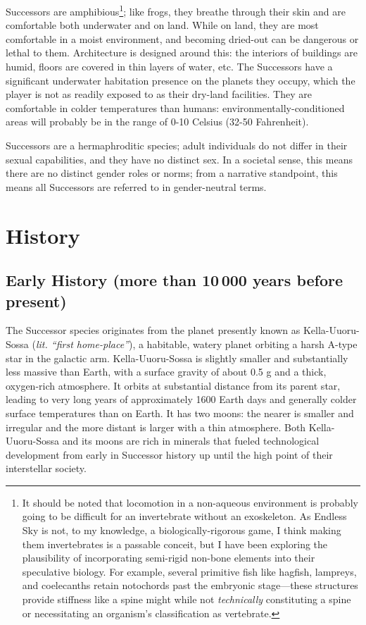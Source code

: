 \documentclass[11pt]{report}
\begin{document}
    Successors are amphibious\footnote[1]{It should be noted that locomotion in a non-aqueous environment is probably going to be difficult for an invertebrate without an exoskeleton. As Endless Sky is not, to my knowledge, a biologically-rigorous game, I think making them invertebrates is a passable conceit, but I have been exploring the plausibility of incorporating semi-rigid non-bone elements into their speculative biology. For example, several primitive fish like hagfish, lampreys, and coelecanths retain notochords past the embryonic stage---these structures provide stiffness like a spine might while not \emph{technically} constituting a spine or necessitating an organism's classification as vertebrate.}; like frogs, they breathe through their skin and are comfortable both underwater and on land. While on land, they are most comfortable in a moist environment, and becoming dried-out can be dangerous or lethal to them. Architecture is designed around this: the interiors of buildings are humid, floors are covered in thin layers of water, etc. The Successors have a significant underwater habitation presence on the planets they occupy, which the player is not as readily exposed to as their dry-land facilities. They are comfortable in colder temperatures than humans: environmentally-conditioned areas will probably be in the range of 0-10 Celsius (32-50 Fahrenheit).
    
    Successors are a hermaphroditic species; adult individuals do not differ in their sexual capabilities, and they have no distinct sex. In a societal sense, this means there are no distinct gender roles or norms; from a narrative standpoint, this means all Successors are referred to in gender-neutral terms.
    \section{History}
    \subsection{Early History (more than 10\,000 years before present)}
    The Successor species originates from the planet presently known as Kella-Uuoru-Sossa (\emph{lit. ``first home-place''}), a habitable, watery planet orbiting a harsh A-type star in the galactic arm. Kella-Uuoru-Sossa is slightly smaller and substantially less massive than Earth, with a surface gravity of about 0.5 g and a thick, oxygen-rich atmosphere. It orbits at substantial distance from its parent star, leading to very long years of approximately 1600 Earth days and generally colder surface temperatures than on Earth. It has two moons: the nearer is smaller and irregular and the more distant is larger with a thin atmosphere. Both Kella-Uuoru-Sossa and its moons are rich in minerals that fueled technological development from early in Successor history up until the high point of their interstellar society.
    
\end{document}
